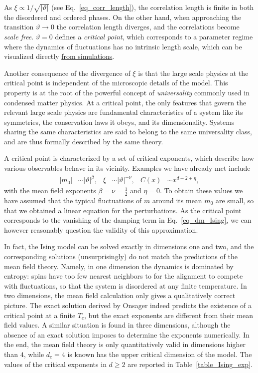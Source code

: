 As $\xi \propto 1/\sqrt{ |\vartheta| }$ (see Eq.~\eqref{eq_corr_length}), the correlation length is finite in both the disordered and ordered phases.
On the other hand, when approaching the transition $\vartheta \to 0$ the correlation length diverges, and the correlations become \emph{scale free}.
$\vartheta = 0$ defines a \emph{critical point}, which corresponds to a parameter regime where the dynamics of fluctuations has no intrinsic length scale, which can be visualized directly \href{https://www.youtube.com/watch?v=lQxD1PinDbs}{from simulations}.

Another consequence of the divergence of $\xi$ is that the large scale physics at the critical point is independent of the microscopic details of the model.
This property is at the root of the powerful concept of \emph{universality} commonly used in condensed matter physics.
At a critical point, the only features that govern the relevant large scale physics are fundamental characteristics of a system like its symmetries, the conservation laws it obeys, and its dimensionality.
Systems sharing the same characteristics are said to belong to the same universality class, and are thus formally described by the same theory.

A critical point is characterized by a set of critical exponents, which describe how various observables behave in its vicinity.
Examples we have already met include
%
\begin{align}
    |m_0| &\sim |\vartheta|^\beta, &
    \xi & \sim |\vartheta|^{-\nu}, &
    C(x) & \sim x^{d - 2 + \eta},
\end{align}
%
with the mean field exponents $\beta = \nu = \tfrac{1}{2}$ and $\eta = 0$.
To obtain these values we have assumed that the typical fluctuations of $m$ around its mean $m_0$ are small, so that we obtained a linear equation for the perturbations.
As the critical point corresponds to the vanishing of the damping term in Eq.~\eqref{eq_dm_Ising}, 
we can however reasonably question the validity of this approximation.

In fact, the Ising model can be solved exactly in dimensions one and two, 
and the corresponding solutions (unsurprisingly) do not match the predictions of the mean field theory.
Namely, in one dimension the dynamics is dominated by entropy: spins have too few nearest neighbors to for the alignment to compete with fluctuations, so that the system is disordered at any finite temperature.
In two dimensions, the mean field calculation only gives a qualitatively correct picture. 
The exact solution derived by Onsager indeed predicts the existence of a critical point at a finite $T_c$, but the exact exponents are different from their mean field values.  
A similar situation is found in three dimensions, although the absence of an exact solution imposes to determine the exponents numerically.
In the end, the mean field theory is only quantitatively valid in dimensions higher than $4$, while $d_c = 4$ is known has the upper critical dimension of the model.
The values of the critical exponents in $d \ge 2$ are reported in Table~\ref{table_Ising_exp}.

